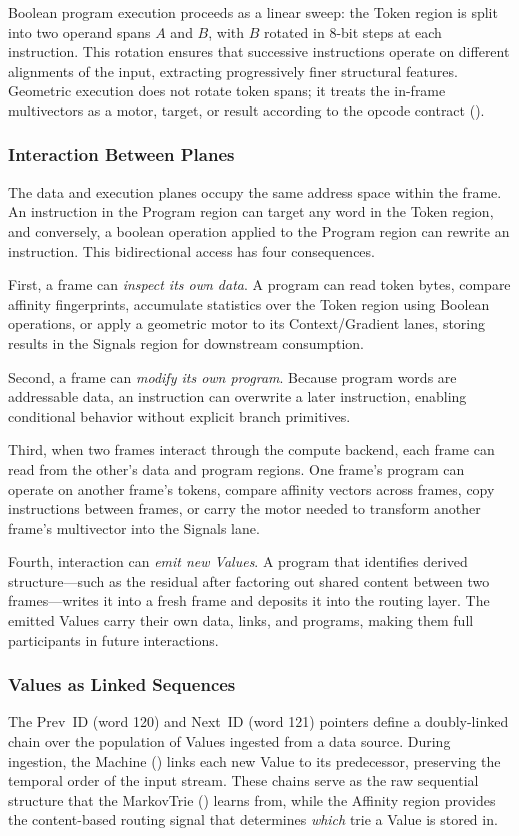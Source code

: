 Boolean program execution proceeds as a linear sweep: the Token region
is split into two operand spans $A$ and $B$, with $B$ rotated in 8-bit
steps at each instruction.  This rotation ensures that successive
instructions operate on different alignments of the input, extracting
progressively finer structural features.  Geometric execution does not
rotate token spans; it treats the in-frame multivectors as a motor,
target, or result according to the opcode contract
().

\subsubsection{Interaction Between Planes}

The data and execution planes occupy the same address space within the
frame.  An instruction in the Program region can target any word in the
Token region, and conversely, a boolean operation applied to the Program
region can rewrite an instruction.  This bidirectional access has four
consequences.

First, a frame can \emph{inspect its own data}.  A program can read
token bytes, compare affinity fingerprints, accumulate statistics over
the Token region using Boolean operations, or apply a geometric motor to
its Context/Gradient lanes, storing results in the Signals region for
downstream consumption.

Second, a frame can \emph{modify its own program}.  Because program
words are addressable data, an instruction can overwrite a later
instruction, enabling conditional behavior without explicit branch
primitives.

Third, when two frames interact through the compute backend, each frame
can read from the other's data and program regions.  One frame's program
can operate on another frame's tokens, compare affinity vectors across
frames, copy instructions between frames, or carry the motor needed to
transform another frame's multivector into the Signals lane.

Fourth, interaction can \emph{emit new Values}.  A program that
identifies derived structure---such as the residual after factoring
out shared content between two frames---writes it into a fresh frame
and deposits it into the routing layer.  The emitted Values carry their
own data, links, and programs, making them full participants in future
interactions.

\subsubsection{Values as Linked Sequences}

The Prev~ID (word 120) and Next~ID (word 121) pointers define a
doubly-linked chain over the population of Values ingested from a
data source.  During ingestion, the Machine ()
links each new Value to its predecessor, preserving the temporal order
of the input stream.  These chains serve as the raw sequential structure
that the MarkovTrie () learns from, while the
Affinity region provides the content-based routing signal that
determines \emph{which} trie a Value is stored in.

